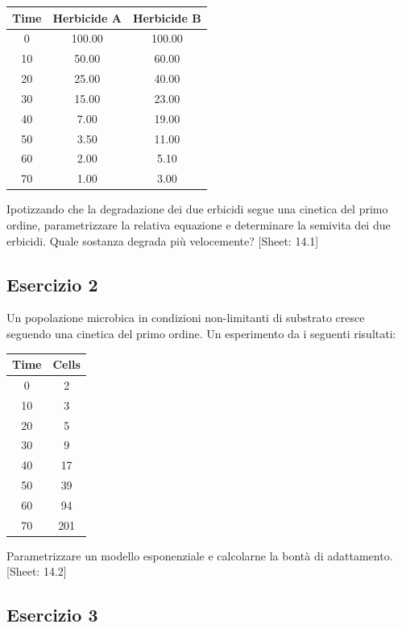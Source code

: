 \documentclass[a4paper,12pt,oneside]{book}
\begin{document}
\begin{longtable}[]{@{}ccc@{}}
\toprule()
Time & Herbicide A & Herbicide B \\
\midrule()
\endhead
0 & 100.00 & 100.00 \\
10 & 50.00 & 60.00 \\
20 & 25.00 & 40.00 \\
30 & 15.00 & 23.00 \\
40 & 7.00 & 19.00 \\
50 & 3.50 & 11.00 \\
60 & 2.00 & 5.10 \\
70 & 1.00 & 3.00 \\
\bottomrule()
\end{longtable}

Ipotizzando che la degradazione dei due erbicidi segue una cinetica del primo ordine, parametrizzare la relativa equazione e determinare la semivita dei due erbicidi. Quale sostanza degrada più velocemente?
{[}Sheet: 14.1{]}

\hypertarget{esercizio-2-9}{%
\subsection{Esercizio 2}\label{esercizio-2-9}}

Un popolazione microbica in condizioni non-limitanti di substrato cresce seguendo una cinetica del primo ordine. Un esperimento da i seguenti risultati:

\begin{longtable}[]{@{}cc@{}}
\toprule()
Time & Cells \\
\midrule()
\endhead
0 & 2 \\
10 & 3 \\
20 & 5 \\
30 & 9 \\
40 & 17 \\
50 & 39 \\
60 & 94 \\
70 & 201 \\
\bottomrule()
\end{longtable}

Parametrizzare un modello esponenziale e calcolarne la bontà di adattamento.
{[}Sheet: 14.2{]}

\hypertarget{esercizio-3-8}{%
\subsection{Esercizio 3}\label{esercizio-3-8}}
\end{document}

